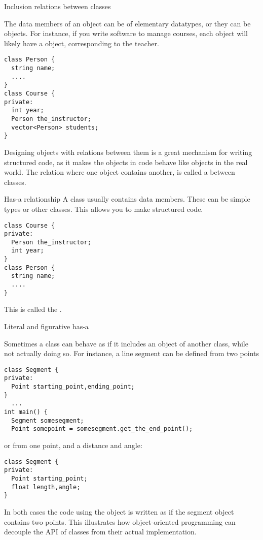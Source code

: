 
 {Inclusion relations between classes}
\label{sec:hasa}

The data members of an object can be of elementary datatypes, or they
can be objects. For instance, if you write software to manage courses,
each  object will likely have a  object,
corresponding to the teacher.

\begin{lstlisting}
class Person {
  string name;
  ....
}
class Course {
private:
  int year;
  Person the_instructor;
  vector<Person> students;
}
\end{lstlisting}

Designing objects with relations between them
is a great mechanism for writing structured code,
as it makes the objects in code behave like objects in the real world.
The relation where one object contains another, is called a
 between classes.

\begin{slide}{Has-a relationship}
  \label{sl:obj-hasa}
  A class usually contains data members. These can be simple types or
  other classes. This allows you to make structured code.
\begin{lstlisting}
class Course {
private:
  Person the_instructor;
  int year;
}
class Person {
  string name;
  ....
}
\end{lstlisting}
  This is
  called the .  
\end{slide}

 {Literal and figurative has-a}

Sometimes a class can behave as if it includes an object of another
class, while not actually doing so. For instance, a line segment can
be defined from two points
\begin{lstlisting}
class Segment {
private:
  Point starting_point,ending_point;
}
  ...
int main() {
  Segment somesegment;
  Point somepoint = somesegment.get_the_end_point();
\end{lstlisting}
or from one point, and a distance and angle:
\begin{lstlisting}
class Segment {
private:
  Point starting_point;
  float length,angle;
}
\end{lstlisting}
In both cases the code using the object is written as if the segment
object contains two points.
This illustrates how object-oriented programming can decouple the
\ac{API} of classes from their actual implementation.

